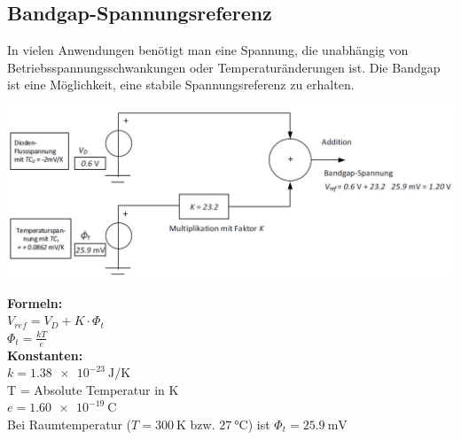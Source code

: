 \subsection{Bandgap-Spannungsreferenz}
In vielen Anwendungen benötigt man eine Spannung, die unabhängig von Betriebsspannungsschwankungen oder Temperaturänderungen ist.
Die Bandgap ist eine Möglichkeit, eine stabile Spannungsreferenz zu erhalten.\\
\begin{minipage}[c]{0.5\textwidth}
	\includegraphics[width=1\linewidth]{chapters/Spannungsref/images/Bandgap}
\end{minipage}
\begin{minipage}[c]{0.5\textwidth}
	\textbf{Formeln:}\\
	$V_{ref} = V_D + K\cdot \Phi_t$\\
	$\Phi_t = \frac{kT}{e}$\\[2ex]
	\textbf{Konstanten:}\\
	$k = \SI{1.38e-23}{\joule / \kelvin}$\\
	T = Absolute Temperatur in K\\
	$e = \SI{1.60e-19}{\coulomb}$\\
	Bei Raumtemperatur ($T=\SI{300}{\kelvin}$ bzw. $\SI{27}{\degreeCelsius}$) ist $\Phi_t = \SI{25.9}{\milli\volt}$
\end{minipage}
